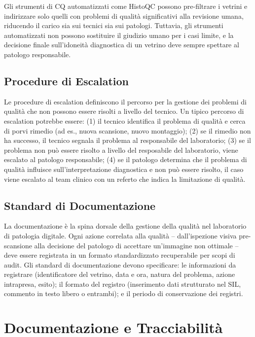 Gli strumenti di CQ automatizzati come HistoQC \cite{janowczyk2019} possono pre-filtrare i
vetrini e indirizzare solo quelli con problemi di qualità significativi alla revisione umana,
riducendo il carico sia sui tecnici sia sui patologi. Tuttavia, gli strumenti automatizzati non
possono sostituire il giudizio umano per i casi limite, e la decisione finale sull'idoneità
diagnostica di un vetrino deve sempre spettare al patologo responsabile.

\subsection{Procedure di Escalation}

Le procedure di escalation definiscono il percorso per la gestione dei problemi di qualità che
non possono essere risolti a livello del tecnico. Un tipico percorso di escalation potrebbe
essere: (1) il tecnico identifica il problema di qualità e cerca di porvi rimedio (ad es., nuova
scansione, nuovo montaggio); (2) se il rimedio non ha successo, il tecnico segnala il
problema al responsabile del laboratorio; (3) se il problema non può essere
risolto a livello del resposabile del laboratorio, viene escalato al patologo responsabile; (4) se il patologo
determina che il problema di qualità influisce sull'interpretazione diagnostica e non può essere
risolto, il caso viene escalato al team clinico con un referto che indica la limitazione di
qualità.

\subsection{Standard di Documentazione}

La documentazione è la spina dorsale della gestione della qualità nel laboratorio di patologia
digitale. Ogni azione correlata alla qualità -- dall'ispezione visiva pre-scansione alla
decisione del patologo di accettare un'immagine non ottimale -- deve essere registrata in un
formato standardizzato recuperabile per scopi di audit. Gli standard di documentazione devono
specificare: le informazioni da registrare (identificatore del vetrino, data e ora, natura del
problema, azione intrapresa, esito); il formato del registro (inserimento dati strutturato nel
SIL, commento in testo libero o entrambi); e il periodo di conservazione dei registri.

\section{Documentazione e Tracciabilità}
\label{sec:ch2-documentation}

